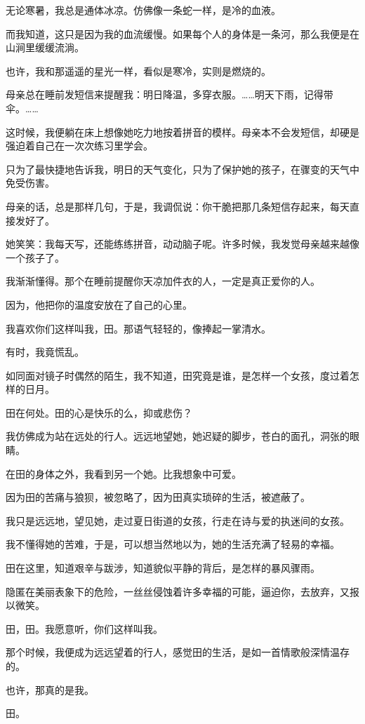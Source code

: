 \documentclass[12pt,a4paper]{article}
\def\blankrev{\vspace{1ex}}									%
\begin{document}
		\blankrev
		无论寒暑，我总是通体冰凉。仿佛像一条蛇一样，是冷的血液。\par
		而我知道，这只是因为我的血流缓慢。如果每个人的身体是一条河，那么我便是在山涧里缓缓流淌。\par
		也许，我和那遥遥的星光一样，看似是寒冷，实则是燃烧的。

		\blankrev
		母亲总在睡前发短信来提醒我：明日降温，多穿衣服。……明天下雨，记得带伞。……\par
		这时候，我便躺在床上想像她吃力地按着拼音的模样。母亲本不会发短信，却硬是强迫着自己在一次次练习里学会。\par
		只为了最快捷地告诉我，明日的天气变化，只为了保护她的孩子，在骤变的天气中免受伤害。\par
		母亲的话，总是那样几句，于是，我调侃说：你干脆把那几条短信存起来，每天直接发好了。\par
		她笑笑：我每天写，还能练练拼音，动动脑子呢。许多时候，我发觉母亲越来越像一个孩子了。

		\blankrev
		我渐渐懂得。那个在睡前提醒你天凉加件衣的人，一定是真正爱你的人。\par
		因为，他把你的温度安放在了自己的心里。

	\endwriting



		我喜欢你们这样叫我，田。那语气轻轻的，像捧起一掌清水。\par
		有时，我竟慌乱。\par
		如同面对镜子时偶然的陌生，我不知道，田究竟是谁，是怎样一个女孩，度过着怎样的日月。\par
		田在何处。田的心是快乐的么，抑或悲伤？\par
		我仿佛成为站在远处的行人。远远地望她，她迟疑的脚步，苍白的面孔，洞张的眼睛。\par
		在田的身体之外，我看到另一个她。比我想象中可爱。\par
		因为田的苦痛与狼狈，被忽略了，因为田真实琐碎的生活，被遮蔽了。\par
		我只是远远地，望见她，走过夏日街道的女孩，行走在诗与爱的执迷间的女孩。\par
		我不懂得她的苦难，于是，可以想当然地以为，她的生活充满了轻易的幸福。\par
		田在这里，知道艰辛与跋涉，知道貌似平静的背后，是怎样的暴风骤雨。\par
		隐匿在美丽表象下的危险，一丝丝侵蚀着许多幸福的可能，逼迫你，去放弃，又报以微笑。\par
		田，田。我愿意听，你们这样叫我。\par
		那个时候，我便成为远远望着的行人，感觉田的生活，是如一首情歌般深情温存的。\par
		也许，那真的是我。\par
		田。
\end{document}

